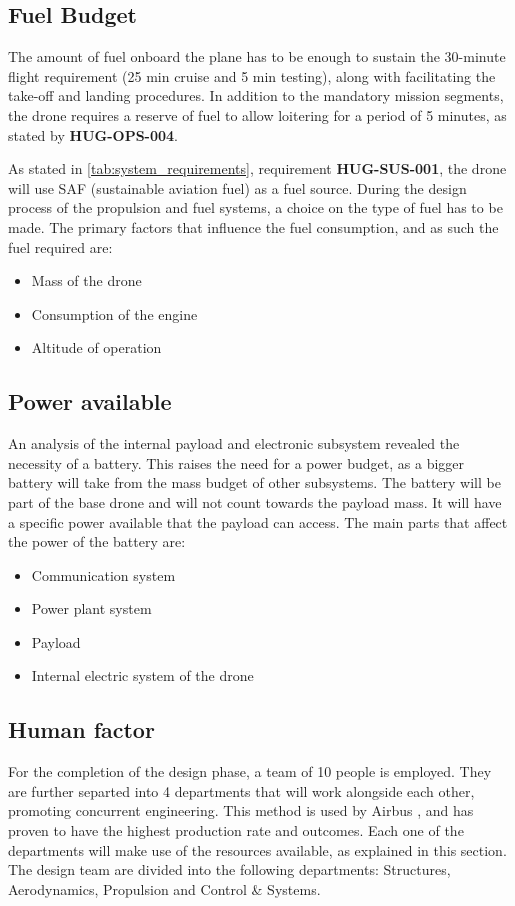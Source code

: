 \subsection{Fuel Budget}
The amount of fuel onboard the plane has to be enough to sustain the 30-minute flight requirement (25 min cruise and 5 min testing), along with facilitating the take-off and landing procedures. In addition to the mandatory mission segments, the drone requires a reserve of fuel to allow loitering for a period of 5 minutes, as stated by \textbf{HUG-OPS-004}.

As stated in \autoref{tab:system_requirements}, requirement \textbf{HUG-SUS-001}, the drone will use SAF (sustainable aviation fuel) as a fuel source. During the design process of the propulsion and fuel systems, a choice on the type of fuel has to be made.
The primary factors that influence the fuel consumption, and as such the fuel required are:
\begin{itemize}
    \item Mass of the drone
    \item Consumption of the engine
    \item Altitude of operation
\end{itemize}

\subsection{Power available}
An analysis of the internal payload and electronic subsystem revealed the necessity of a battery. This raises the need for a power budget, as a bigger battery will take from the mass budget of other subsystems. The battery will be part of the base drone and will not count towards the payload mass. It will have a specific power available that the payload can access.
The main parts that affect the power of the battery are:

\begin{itemize}
    \item Communication system
    \item Power plant system
    \item Payload
    \item Internal electric system of the drone
\end{itemize}

\subsection{Human factor}
For the completion of the design phase, a team of 10 people is employed. They are further separted into 4 departments that will work alongside each other, promoting concurrent engineering. This method is used by Airbus \cite{Airbus_Concurent}, and has proven to have the highest production rate and outcomes.
Each one of the departments will make use of the resources available, as explained in this section. The design team are divided into the following departments: Structures, Aerodynamics, Propulsion and Control \& Systems.


